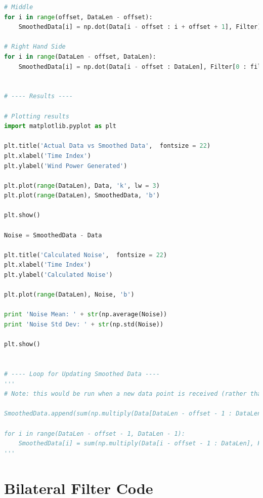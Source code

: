\documentclass[11pt]{article}
\theoremstyle{definition}
\begin{document}
\begin{lstlisting}[language = Python]
# Middle
for i in range(offset, DataLen - offset):
    SmoothedData[i] = np.dot(Data[i - offset : i + offset + 1], Filter)

# Right Hand Side
for i in range(DataLen - offset, DataLen):
    SmoothedData[i] = np.dot(Data[i - offset : DataLen], Filter[0 : filtersize - offset - i + DataLen - 1]/np.sum(Filter[0 : filtersize - offset - i + DataLen - 1]))


# ---- Results ----

# Plotting results
import matplotlib.pyplot as plt

plt.title('Actual Data vs Smoothed Data',  fontsize = 22)
plt.xlabel('Time Index')
plt.ylabel('Wind Power Generated')

plt.plot(range(DataLen), Data, 'k', lw = 3)
plt.plot(range(DataLen), SmoothedData, 'b')

plt.show()

Noise = SmoothedData - Data

plt.title('Calculated Noise',  fontsize = 22)
plt.xlabel('Time Index')
plt.ylabel('Calculated Noise')

plt.plot(range(DataLen), Noise, 'b')

print 'Noise Mean: ' + str(np.average(Noise))
print 'Noise Std Dev: ' + str(np.std(Noise))

plt.show()


# ---- Loop for Updating Smoothed Data ----
'''
# Note: this would be run when a new data point is received (rather than re-running the whole function for all data)

SmoothedData.append(sum(np.multiply(Data[DataLen - offset - 1 : DataLen], Filter[0 : offset]/sum(Filter[0 : offset]))))

for i in range(DataLen - offset - 1, DataLen - 1):
    SmoothedData[i] = sum(np.multiply(Data[i - offset - 1 : DataLen], Filter[0 : filtersize - offset - i + DataLen]/sum(Filter[0 : filtersize - offset - i +DataLen])))
'''

\end{lstlisting}

\pagebreak


\section{Bilateral Filter Code}
\end{document}
